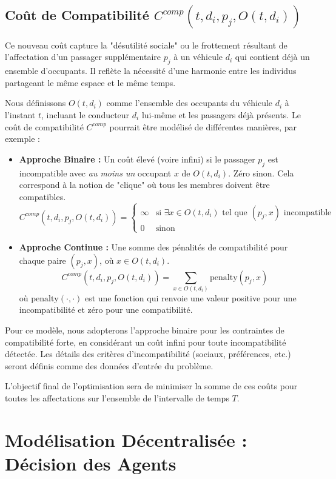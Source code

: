 \documentclass[12pt, a4paper]{article}
\begin{document}
\subsection{Coût de Compatibilité $C^{comp}(t, d_i, p_j, O(t, d_i))$}
Ce nouveau coût capture la "désutilité sociale" ou le frottement résultant de l'affectation d'un passager supplémentaire $p_j$ à un véhicule $d_i$ qui contient déjà un ensemble d'occupants. Il reflète la nécessité d'une harmonie entre les individus partageant le même espace et le même temps.

Nous définissons $O(t, d_i)$ comme l'ensemble des occupants du véhicule $d_i$ à l'instant $t$, incluant le conducteur $d_i$ lui-même et les passagers déjà présents.
Le coût de compatibilité $C^{comp}$ pourrait être modélisé de différentes manières, par exemple :
\begin{itemize}
    \item \textbf{Approche Binaire :} Un coût élevé (voire infini) si le passager $p_j$ est incompatible avec \textit{au moins un} occupant $x$ de $O(t, d_i)$. Zéro sinon. Cela correspond à la notion de "clique" où tous les membres doivent être compatibles.
    $$ C^{comp}(t, d_i, p_j, O(t, d_i)) = \begin{cases}
        \infty & \text{si } \exists x \in O(t, d_i) \text{ tel que } (p_j, x) \text{ incompatible} \\
        0 & \text{sinon}
    \end{cases} $$
    \item \textbf{Approche Continue :} Une somme des pénalités de compatibilité pour chaque paire $(p_j, x)$, où $x \in O(t, d_i)$.
    $$ C^{comp}(t, d_i, p_j, O(t, d_i)) = \sum_{x \in O(t, d_i)} \text{penalty}(p_j, x) $$
    où $\text{penalty}(\cdot, \cdot)$ est une fonction qui renvoie une valeur positive pour une incompatibilité et zéro pour une compatibilité.
\end{itemize}
Pour ce modèle, nous adopterons l'approche binaire pour les contraintes de compatibilité forte, en considérant un coût infini pour toute incompatibilité détectée. Les détails des critères d'incompatibilité (sociaux, préférences, etc.) seront définis comme des données d'entrée du problème.

L'objectif final de l'optimisation sera de minimiser la somme de ces coûts pour toutes les affectations sur l'ensemble de l'intervalle de temps $T$.

\section{Modélisation Décentralisée : Décision des Agents}
\end{document}
